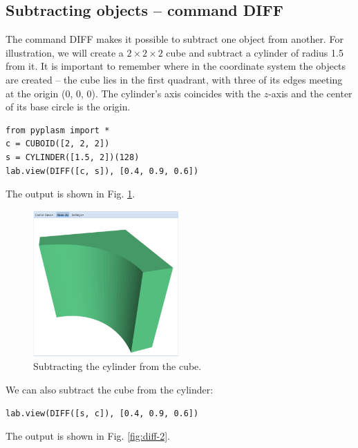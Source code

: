 \documentclass[article,A4,12pt]{llncs}
\begin{document}
\subsection{Subtracting objects -- command DIFF}

The command DIFF makes it possible to subtract one object from another.
For illustration, we will create a $2 \times 2 \times 2$ cube and subtract 
a cylinder of radius 1.5 from it. It is important to remember where in the 
coordinate system the objects are created -- the cube lies in the 
first quadrant, with three of its edges meeting at the origin (0, 0, 0).
The cylinder's axis coincides with the $z$-axis and the center of its base
circle is the origin. 

\begin{verbatim}
from pyplasm import *
c = CUBOID([2, 2, 2])
s = CYLINDER([1.5, 2])(128)
lab.view(DIFF([c, s]), [0.4, 0.9, 0.6]) 
\end{verbatim}
The output is shown in Fig. \ref{fig:diff-1}.

\newpage

\begin{figure}[!ht]
\begin{center}
\includegraphics[width=0.5\textwidth]{img/diff-1.png}
\end{center}
\vspace{-2mm}
\caption{Subtracting the cylinder from the cube.}
\label{fig:diff-1}
\end{figure}
\noindent
We can also subtract the cube from the cylinder:

\begin{verbatim}
lab.view(DIFF([s, c]), [0.4, 0.9, 0.6]) 
\end{verbatim}
The output is shown in Fig. \ref{fig:diff-2}.

\newpage
\end{document}
